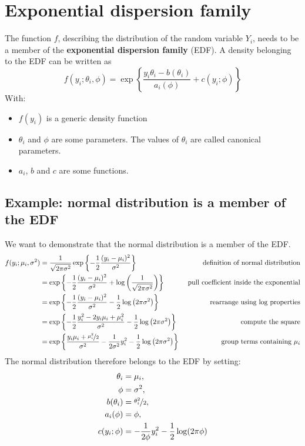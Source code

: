  \section{Exponential dispersion family}
    The function $f$, describing the distribution of the random variable $Y_i$, needs to be a member of the \textbf{exponential dispersion family} (EDF). A density belonging to the EDF can be written as
    $$f(y_i;\theta_i,\phi)=\exp\left\{\frac{y_i\theta_i-b(\theta_i)}{a_i(\phi)}+c(y_i;\phi)\right\}$$
    With:
    \begin{itemize}
      \item $f(y_i)$ is a generic density function 
      \item $\theta_i$ and $\phi$ are some parameters. The values of $\theta_i$ are called canonical parameters.
      \item $a_i$, $b$ and $c$ are some functions.
    \end{itemize}

    \subsection{Example: normal distribution is a member of the EDF}
      We want to demonstrate that the normal distribution is a member of the EDF.
      \begin{align*}
      f(y_i; \mu_i, \sigma^2)
        &= \frac{1}{\sqrt{2\pi\sigma^2}} \exp\left\{-\frac{1}{2} \frac{(y_i-\mu_i)^2}{\sigma^2}\right\}
        & \text{ definition of normal distribution}\\
        &= \exp\left\{-\frac{1}{2} \frac{(y_i-\mu_i)^2}{\sigma^2} + \log\left(\frac{1}{\sqrt{2\pi\sigma^2}}\right)\right\}
        & \text{ pull coefficient inside the exponential}\\
        &= \exp\left\{-\frac{1}{2} \frac{(y_i-\mu_i)^2}{\sigma^2} -\frac{1}{2}\log\left(2\pi\sigma^2\right)\right\}
        & \text{ rearrange using log properties}\\
        &= \exp\left\{-\frac{1}{2} \frac{y_i^2-2y_i\mu_i+\mu_i^2}{\sigma^2} -\frac{1}{2}\log\left(2\pi\sigma^2\right)\right\}
        & \text{ compute the square}\\
        &= \exp\left\{\frac{y_i\mu_i+\nicefrac{\mu_i^2}{2}}{\sigma^2} - \frac{1}{2\sigma^2}y_i^2 - \frac{1}{2}\log\left(2\pi\sigma^2\right)\right\}
        & \text{ group terms containing } \mu_i\\
      \end{align*}
      The normal distribution therefore belongs to the EDF by setting:
      \begin{align*}
        \theta_i     &= \mu_i, \\
        \phi         &= \sigma^2, \\
        b(\theta_i)  &= \nicefrac{\theta_i^2}{2}, \\
        a_i(\phi)    &= \phi, \\
        c(y_i; \phi) &= - \frac{1}{2\phi} y_i^2 - \frac{1}{2}\log(2\pi\phi)
      \end{align*}

